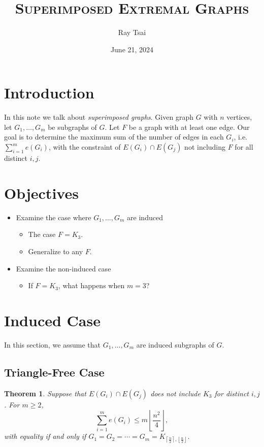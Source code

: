 \documentclass[a4paper]{article}
\title{\textsc{Superimposed Extremal Graphs}}
\author{Ray Tsai}
\date{June 21, 2024}
\newtheorem{theorem}{Theorem}[section]
\begin{document}
\maketitle
                                                                                                                                
\section{Introduction}

In this note we talk about \textit{superimposed graphs}. Given graph $G$ with $n$ vertices, let
$G_1, \ldots, G_m$ be subgraphs of $G$. Let $F$ be a graph with at least one edge. Our goal is to
determine the maximum sum of the number of edges in each $G_i$, i.e. $\sum_{i = 1}^m e(G_i)$, with
the constraint of $E(G_i) \cap E(G_j)$ not including $F$ for all distinct $i, j$. 

\section{Objectives}

\begin{itemize}
  \item Examine the case where $G_1, \ldots, G_m$ are induced
  \begin{itemize}
    \item The case $F = K_3$.
    \item Generalize to any $F$.
  \end{itemize}
  \item Examine the non-induced case
  \begin{itemize}
    \item If $F = K_3$, what happens when $m = 3$?
  \end{itemize}
\end{itemize}


\section{Induced Case}

In this section, we assume that $G_1, \ldots, G_m$ are induced subgraphs of $G$.

\subsection{Triangle-Free Case}

\begin{theorem}
  Suppose that $E(G_i) \cap E(G_j)$ does not include $K_3$ for distinct $i, j$. For $m \geq 2$,
  \[
    \sum_{i = 1}^m e(G_i) \leq m\left\lfloor\frac{n^2}{4}\right\rfloor,
  \]
  with equality if and only if $G_1 = G_2 = \cdots = G_m = K_{\left\lceil\frac{n}{2}\right\rceil,
  \left\lfloor\frac{n}{2}\right\rfloor}$.
\end{theorem}
\end{document}
